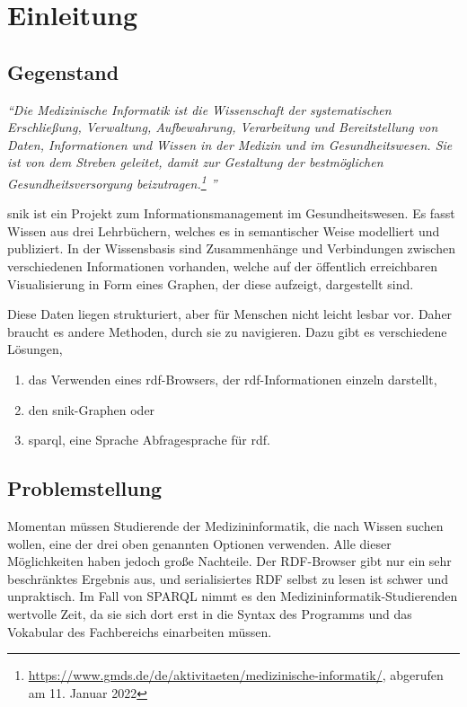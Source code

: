 \chapter{Einleitung}\label{ch:introduction}

\section{Gegenstand}
\begin{flushright}{\slshape
\enquote{Die Medizinische Informatik ist die Wissenschaft der systematischen Erschließung, Verwaltung, Aufbewahrung, Verarbeitung und Bereitstellung von Daten, Informationen und Wissen in der Medizin und im Gesundheitswesen.
Sie ist von dem Streben geleitet, damit zur Gestaltung der bestmöglichen Gesundheitsversorgung beizutragen.\footnote{\url{https://www.gmds.de/de/aktivitaeten/medizinische-informatik/}, abgerufen am 11. Januar 2022}
}}
\end{flushright}
\ac{snik} ist ein Projekt zum Informationsmanagement im Gesundheitswesen.
Es fasst Wissen aus drei Lehrbüchern, welches es in semantischer Weise modelliert und publiziert.
In der Wissensbasis sind Zusammenhänge und Verbindungen zwischen verschiedenen Informationen vorhanden, welche auf der öffentlich erreichbaren Visualisierung in Form eines Graphen, der diese aufzeigt, dargestellt sind.

Diese Daten liegen strukturiert, aber für Menschen nicht leicht lesbar vor. Daher braucht es andere Methoden, durch sie zu navigieren.
Dazu gibt es verschiedene Lösungen,
\begin{enumerate}
	\item das Verwenden eines \acs{rdf}-Browsers, der \acs{rdf}-Informationen einzeln darstellt,
	\item den \ac{snik}-Graphen oder
	\item \acs{sparql}, eine Sprache Abfragesprache für \acs{rdf}.
\end{enumerate}

\section{Problemstellung}

Momentan müssen Studierende der Medizininformatik, die nach Wissen suchen wollen, eine der drei oben genannten Optionen verwenden.
Alle dieser Möglichkeiten haben jedoch große Nachteile.
Der RDF-Browser gibt nur ein sehr beschränktes Ergebnis aus, und serialisiertes RDF selbst zu lesen ist schwer und unpraktisch.
Im Fall von SPARQL nimmt es den Medizininformatik-Studierenden wertvolle Zeit, da sie sich dort erst in die Syntax des Programms und das Vokabular des Fachbereichs einarbeiten müssen.

